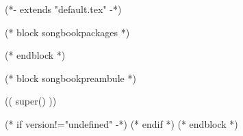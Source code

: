 (*- extends "default.tex" -*)

(* block songbookpackages *)
\usepackage[
    ((booktype)),
    (* for option in bookoptions *)
    ((option)),
    (* endfor *)
    (* for instrument in instruments *)
    ((instrument)),
    (* endfor *)
    ]{crepbook}
(* endblock *)

(* block songbookpreambule *)
\usepackage[
     a4paper %
     ,includeheadfoot %
     ,hmarginratio=1:1 %
     ,outer=1.8cm %
     ,vmarginratio=1:1 %
     ,bmargin=1.3cm %
     ]{geometry}

(( super() ))

\pagestyle{empty}


\renewcommand{\snumbgcolor}{SongNumberBgColor}
\renewcommand{\notebgcolor}{NoteBgColor}
\renewcommand{\idxbgcolor}{IndexBgColor}

\usepackage[
    bookmarks,
    bookmarksopen,
    hyperfigures=true,
    colorlinks=true,
    linkcolor=tango-green-3,
    urlcolor=tango-blue-3
    ]{hyperref}


\subtitle{((subtitle))}
(* if version!="undefined" -*)
(* endif *)
(* endblock *)
